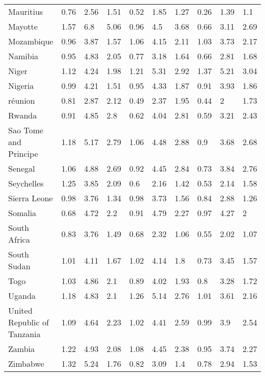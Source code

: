 \begin{longtable}[t]{llllllllll}
Mauritius & 0.76 & 2.56 & 1.51 & 0.52 & 1.85 & 1.27 & 0.26 & 1.39 & 1.1\\
Mayotte & 1.57 & 6.8 & 5.06 & 0.96 & 4.5 & 3.68 & 0.66 & 3.11 & 2.69\\
Mozambique & 0.96 & 3.87 & 1.57 & 1.06 & 4.15 & 2.11 & 1.03 & 3.73 & 2.17\\
Namibia & 0.95 & 4.83 & 2.05 & 0.77 & 3.18 & 1.64 & 0.66 & 2.81 & 1.68\\
Niger & 1.12 & 4.24 & 1.98 & 1.21 & 5.31 & 2.92 & 1.37 & 5.21 & 3.04\\
Nigeria & 0.99 & 4.21 & 1.51 & 0.95 & 4.33 & 1.87 & 0.91 & 3.93 & 1.86\\
réunion & 0.81 & 2.87 & 2.12 & 0.49 & 2.37 & 1.95 & 0.44 & 2 & 1.73\\
Rwanda & 0.91 & 4.85 & 2.8 & 0.62 & 4.04 & 2.81 & 0.59 & 3.21 & 2.43\\
Sao Tome and Principe & 1.18 & 5.17 & 2.79 & 1.06 & 4.48 & 2.88 & 0.9 & 3.68 & 2.68\\
Senegal & 1.06 & 4.88 & 2.69 & 0.92 & 4.45 & 2.84 & 0.73 & 3.84 & 2.76\\
Seychelles & 1.25 & 3.85 & 2.09 & 0.6 & 2.16 & 1.42 & 0.53 & 2.14 & 1.58\\
Sierra Leone & 0.98 & 3.76 & 1.34 & 0.98 & 3.73 & 1.56 & 0.84 & 2.88 & 1.26\\
Somalia & 0.68 & 4.72 & 2.2 & 0.91 & 4.79 & 2.27 & 0.97 & 4.27 & 2\\
South Africa & 0.83 & 3.76 & 1.49 & 0.68 & 2.32 & 1.06 & 0.55 & 2.02 & 1.07\\
South Sudan & 1.01 & 4.11 & 1.67 & 1.02 & 4.14 & 1.8 & 0.73 & 3.45 & 1.57\\
Togo & 1.03 & 4.86 & 2.1 & 0.89 & 4.02 & 1.93 & 0.8 & 3.28 & 1.72\\
Uganda & 1.18 & 4.83 & 2.1 & 1.26 & 5.14 & 2.76 & 1.01 & 3.61 & 2.16\\
United Republic of Tanzania & 1.09 & 4.64 & 2.23 & 1.02 & 4.41 & 2.59 & 0.99 & 3.9 & 2.54\\
Zambia & 1.22 & 4.93 & 2.08 & 1.08 & 4.45 & 2.38 & 0.95 & 3.74 & 2.27\\
Zimbabwe & 1.32 & 5.24 & 1.76 & 0.82 & 3.09 & 1.4 & 0.78 & 2.94 & 1.53\\*
\end{longtable}
\endgroup{}
